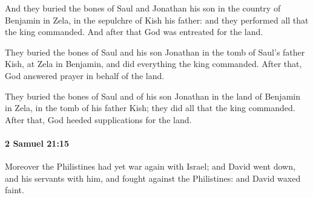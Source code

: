 			\begin{versebox}
					\item[BHS] 
					\item[ASV] And they buried the bones of Saul and Jonathan his son in the country of Benjamin in Zela, in the sepulchre of Kish his father: and they performed all that the king commanded. And after that God was entreated for the land.
					\item[NIV] They buried the bones of Saul and his son Jonathan in the tomb of Saul’s father Kish, at Zela in Benjamin, and did everything the king commanded. After that, God answered prayer in behalf of the land.
					\item[NRSV] They buried the bones of Saul and of his son Jonathan in the land of Benjamin in Zela, in the tomb of his father Kish; they did all that the king commanded. After that, God heeded supplications for the land.
			\end{versebox}

		\paragraph{2 Samuel 21:15} %
			\label{2SAMUEL-21-15}

			Moreover the Philistines had yet war again with Israel; and David went down, and his servants with him, and fought against the Philistines: and David waxed faint.

